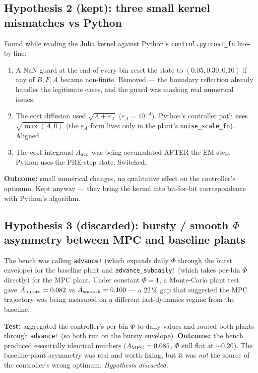 \documentclass[11pt,a4paper]{article}
\begin{document}
\subsection{Hypothesis 2 (kept): three small kernel mismatches vs Python}

Found while reading the Julia kernel against Python's
\texttt{control.py:cost\_fn} line-by-line:

\begin{enumerate}[itemsep=2pt]
\item A NaN guard at the end of every bin reset the state to
  $(0.05, 0.30, 0.10)$ if any of $B,F,A$ became non-finite.
  Removed --- the boundary reflection already handles the legitimate
  cases, and the guard was masking real numerical issues.
\item The cost diffusion used $\sqrt{A + \varepsilon_A}$
  ($\varepsilon_A=10^{-4}$). Python's controller path uses
  $\sqrt{\max(A, 0)}$ (the $\varepsilon_A$ form lives only in the
  plant's \texttt{noise\_scale\_fn}). Aligned.
\item The cost integrand $A_{\rm acc}$ was being accumulated AFTER the
  EM step. Python uses the PRE-step state. Switched.
\end{enumerate}

\textbf{Outcome:} small numerical changes, no qualitative effect on the
controller's optimum. Kept anyway --- they bring the kernel into bit-for-bit
correspondence with Python's algorithm.

\subsection{Hypothesis 3 (discarded): bursty / smooth $\Phi$ asymmetry between MPC and baseline plants}

The bench was calling \texttt{advance!} (which expands daily $\Phi$
through the burst envelope) for the baseline plant and
\texttt{advance\_subdaily!} (which takes per-bin $\Phi$ directly) for
the MPC plant. Under constant $\Phi=1$, a Monte-Carlo plant test gave
$\bar A_{\rm bursty}=0.082$ vs $\bar A_{\rm smooth}=0.100$ — a 22\,\%
gap that suggested the MPC trajectory was being measured on a different
fast-dynamics regime from the baseline.

\textbf{Test:} aggregated the controller's per-bin $\Phi$ to daily
values and routed both plants through \texttt{advance!} (so both run
on the bursty envelope). \textbf{Outcome:} the bench produced
essentially identical numbers ($\bar A_{\rm MPC}=0.085$, $\Phi$ still
flat at $\sim 0.20$). The baseline-plant asymmetry was real and worth
fixing, but it was \emph{not} the source of the controller's wrong
optimum. \emph{Hypothesis discarded.}
\end{document}
